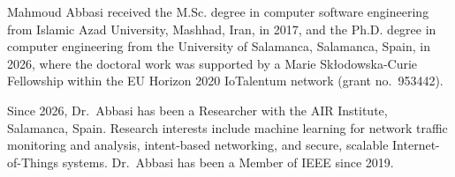 \documentclass[journal]{IEEEtran}
\begin{document}
\balance



\begin{IEEEbiographynophoto}{Mahmoud Abbasi}
received the M.Sc. degree in computer software engineering from Islamic Azad University, Mashhad, Iran, in 2017, and the Ph.D. degree in computer engineering from the University of Salamanca, Salamanca, Spain, in 2026, where the doctoral work was supported by a Marie Sk\l{}odowska-Curie Fellowship within the EU Horizon 2020 IoTalentum network (grant no.\ 953442).

Since 2026, Dr.\ Abbasi has been a Researcher with the AIR Institute, Salamanca, Spain. Research interests include machine learning for network traffic monitoring and analysis, intent-based networking, and secure, scalable Internet-of-Things systems. Dr.\ Abbasi has been a Member of IEEE since 2019.
\end{IEEEbiographynophoto}
\end{document}
